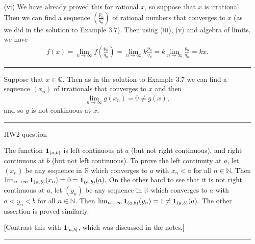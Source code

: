 \documentclass[letterpaper,10pt,english]{jupyterBook}
\begin{document}
\sphinxAtStartPar
(vi) We have already proved this for rational \(x\), so suppose that \(x\) is irrational. Then we can find a sequence \(\left(\frac{p_{n}}{q_{n}}\right)\) of rational numbers that converges to \(x\) (as we did in the solution to Example 3.7). Then using (iii), (v) and algebra of limits, we have
\begin{equation*}
\begin{split}
f(x) = \lim_{n\rightarrow\infty} f\left(\frac{p_n}{q_n}\right) =   \lim_{n\rightarrow\infty} k \frac{p_n}{q_n}=k \lim_{n\rightarrow\infty} \frac{p_n}{q_n} = kx.
\end{split}
\end{equation*}

\bigskip\hrule\bigskip


\sphinxAtStartPar
{\hyperref[\detokenize{Problems:id22}]{}} Suppose that \(x \in \mathbb{Q}\). Then as in the solution to Example 3.7 we can find a sequence \((x_{n})\) of irrationals that converges to \(x\) and then
\begin{equation*}
\begin{split}
\lim_{n\rightarrow\infty} g(x_{n}) = 0 \neq g(x),
\end{split}
\end{equation*}
\sphinxAtStartPar
and so \(g\) is not continuous at \(x\).


\bigskip\hrule\bigskip


\sphinxAtStartPar
{\hyperref[\detokenize{Problems:id23}]{}} HW2 question

The function \({\bf 1}_{(a, b)}\) is left continuous at \(a\) (but not right continuous), and right continuous at \(b\) (but not left continuous).
To prove the left continuity at \(a\), let \((x_{n})\) be any sequence in \(\mathbb{R}\) which converges to \(a\) with \(x_{n} < a\) for all \(n\in\mathbb{N}\). Then \(\lim_{n\rightarrow\infty} {\bf 1}_{(a, b)}(x_{n}) = 0 = {\bf 1}_{(a, b)}(a).\) On the other hand to see that it is not right continuous at \(a\), let \((y_{n})\) be any sequence in \(\mathbb{R}\) which converges to \(a\) with \(a < y_{n} < b\) for all \(n\in\mathbb{N}\). Then
\( \lim_{n\rightarrow\infty} {\bf 1}_{(a, b)}(y_{n}) = 1 \neq {\bf 1}_{(a, b)}(a). \) The other assertion is proved similarly.

{[}Contrast this with \({\bf 1}_{[a, b]}\), which was discussed in the notes.{]}


\bigskip\hrule\bigskip
\end{document}

